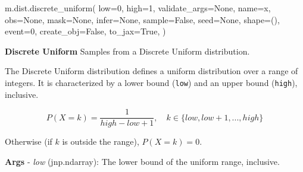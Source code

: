 \documentclass[
  letterpaper,
  DIV=11,
  numbers=noendperiod]{scrartcl}
\newenvironment{Shaded}{\begin{snugshade}}{\end{snugshade}}
\newcommand{\DecValTok}[1]{\textcolor[rgb]{0.68,0.00,0.00}{#1}}
\newcommand{\NormalTok}[1]{\textcolor[rgb]{0.00,0.23,0.31}{#1}}
\newcommand{\OperatorTok}[1]{\textcolor[rgb]{0.37,0.37,0.37}{#1}}
\newcommand{\StringTok}[1]{\textcolor[rgb]{0.13,0.47,0.30}{#1}}
\newcommand{\VariableTok}[1]{\textcolor[rgb]{0.07,0.07,0.07}{#1}}
\begin{document}
\begin{Shaded}
\begin{Highlighting}[]
\NormalTok{m.dist.discrete\_uniform(}
\NormalTok{    low}\OperatorTok{=}\DecValTok{0}\NormalTok{,}
\NormalTok{    high}\OperatorTok{=}\DecValTok{1}\NormalTok{,}
\NormalTok{    validate\_args}\OperatorTok{=}\VariableTok{None}\NormalTok{,}
\NormalTok{    name}\OperatorTok{=}\StringTok{\textquotesingle{}x\textquotesingle{}}\NormalTok{,}
\NormalTok{    obs}\OperatorTok{=}\VariableTok{None}\NormalTok{,}
\NormalTok{    mask}\OperatorTok{=}\VariableTok{None}\NormalTok{,}
\NormalTok{    infer}\OperatorTok{=}\VariableTok{None}\NormalTok{,}
\NormalTok{    sample}\OperatorTok{=}\VariableTok{False}\NormalTok{,}
\NormalTok{    seed}\OperatorTok{=}\VariableTok{None}\NormalTok{,}
\NormalTok{    shape}\OperatorTok{=}\NormalTok{(),}
\NormalTok{    event}\OperatorTok{=}\DecValTok{0}\NormalTok{,}
\NormalTok{    create\_obj}\OperatorTok{=}\VariableTok{False}\NormalTok{,}
\NormalTok{    to\_jax}\OperatorTok{=}\VariableTok{True}\NormalTok{,}
\NormalTok{)}
\end{Highlighting}
\end{Shaded}

\textbf{Discrete Uniform} Samples from a Discrete Uniform distribution.

The Discrete Uniform distribution defines a uniform distribution over a
range of integers. It is characterized by a lower bound (\texttt{low})
and an upper bound (\texttt{high}), inclusive.

\[   
P(X = k) = \frac{1}{high - low + 1}, \quad k \in \{low, low+1, ..., high\}
\]

Otherwise (if \(k\) is outside the range), \(P(X = k) = 0\).

\textbf{Args} - \emph{low} (jnp.ndarray): The lower bound of the uniform
range, inclusive.
\end{document}
